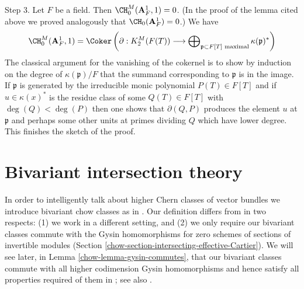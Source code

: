 \begin{remark}
\medskip\noindent
Step 3. Let $F$ be a field. Then $\CH^M_0(\mathbf{A}^1_F, 1) = 0$.
(In the proof of the lemma cited above we proved analogously that
$\CH_0(\mathbf{A}^1_F) = 0$.) We have
$$
\CH^M_0(\mathbf{A}^1_F, 1) = \Coker\left(
\partial : K^M_2(F(T)) \longrightarrow
\bigoplus\nolimits_{\mathfrak p \subset F[T]\text{ maximal}}
\kappa(\mathfrak p)^*\right)
$$
The classical argument for the vanishing of the cokernel is to
show by induction on the degree of $\kappa(\mathfrak p)/F$
that the summand corresponding to $\mathfrak p$ is in the image.
If $\mathfrak p$ is generated by the
irreducible monic polynomial $P(T) \in F[T]$ and if
$u \in \kappa(x)^*$ is the residue class of some
$Q(T) \in F[T]$ with $\deg(Q) < \deg(P)$ then one shows that
$\partial(Q, P)$ produces the element $u$ at $\mathfrak p$
and perhaps some other units at primes dividing $Q$ which
have lower degree. This finishes the sketch of the proof.
\end{remark}

\section{Bivariant intersection theory}
\label{chow-section-bivariant}
In order to intelligently talk about higher Chern classes of vector
bundles we introduce bivariant chow classes as in \cite{F}.
Our definition differs from \cite{F} in two respects:
(1) we work in a different setting, and (2) we only require
our bivariant classes commute with the Gysin homomorphisms for
zero schemes of sections of invertible modules
(Section \ref{chow-section-intersecting-effective-Cartier}).
We will see later, in Lemma \ref{chow-lemma-gysin-commutes}, that our
bivariant classes commute with all higher codimension Gysin homomorphisms
and hence satisfy all properties required of them in \cite{F}; see
also \cite[Theorem 17.1]{F}.

